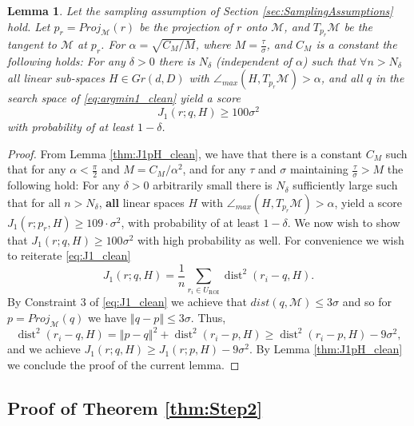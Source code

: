 \documentclass[12pt]{article}
\newtheorem{Lemma}[Theorem]{Lemma}
\theoremstyle{remark}
\newcommand{\MM}{\mathcal{M}}
\newcommand{\norm}[1]{\left\Vert #1 \right\Vert}
\newcommand{\dist}{\operatorname{dist}}
\newcommand{\sM}{{M}}
\begin{document}
\begin{Lemma}\label{lem:J_1qH_clean}
	Let the sampling assumption of Section \ref{sec:SamplingAssumptions} hold. Let ${p_r} = Proj_\MM(r)$ be the projection of $r$ onto $\MM$, and $ T_{p_r}\MM $ be the tangent to $ \MM $ at $ {p_r} $.
	For $\alpha = \sqrt{C_\sM/M}$, where $M = \frac{\tau}{\sigma}$, and $C_\sM$ is a constant  the following holds:
	For any $\delta >0$ there is $N_\delta$ (independent of $\alpha$) such that $\forall n > N_\delta$ all linear sub-spaces $H \in Gr(d,D)$ with $\angle_{max}(H,T_{{p_r}}\MM) > \alpha$, and all $q$ in the search space of \eqref{eq:argmin1_clean} yield a score 
	\[
	J_1(r; {q}, H) \geq 100\sigma^2 
	\]
	with probability of at least $1 - \delta$. 
\end{Lemma}
\begin{proof}
	From Lemma \ref{thm:J1pH_clean}, we have that there is a constant $C_\sM$ such that for any $ {\alpha} < \frac{\pi}{2} $ and $M = C_\sM/\alpha^2$, and for any $\tau$ and $\sigma$ maintaining $\frac{\tau}{\sigma}>M$
	the following hold:
	For any $\delta >0$ arbitrarily small there is $ N_\delta $ sufficiently large such that for all $ n>N_\delta $, \textbf{all} linear spaces $H$ with $\angle_{max}(H,T_{p_r}\MM) > \alpha$, yield a score $J_1(r; p_r, H) \geq 109 \cdot \sigma^2 $, with probability of at least $1 - \delta$. 
	We now wish to show that $J_1(r; q, H) \geq 100 \sigma^2$ with high probability as well.
	For convenience we wish to reiterate \eqref{eq:J1_clean}
	\[
	J_1(r; q, H) = \frac{1}{n}\sum_{r_i\in U_{\textrm{ROI}}} \dist^2 (r_i - q,H)
	.\]
	By Constraint 3 of \eqref{eq:J1_clean} we achieve that $dist(q, \MM) \leq 3\sigma$ and so for $p=Proj_\MM(q)$ we have
	$
	\norm{q - p} \leq 3\sigma
	$.
	Thus,
	\[
	\dist^2 (r_i - q,H) = \norm{p - q}^2 + \dist^2 (r_i - p,H) \geq \dist^2 (r_i - p,H) - 9\sigma^2
	,\]
	and we achieve
	$
	J_1(r; q, H) \geq J_1(r; p, H) - 9\sigma^2
	$.
	By Lemma \ref{thm:J1pH_clean} we conclude the proof of the current lemma.
\end{proof}



\subsection{Proof of Theorem \ref{thm:Step2}}
\label{sec:Step2Analysis}
\end{document}
